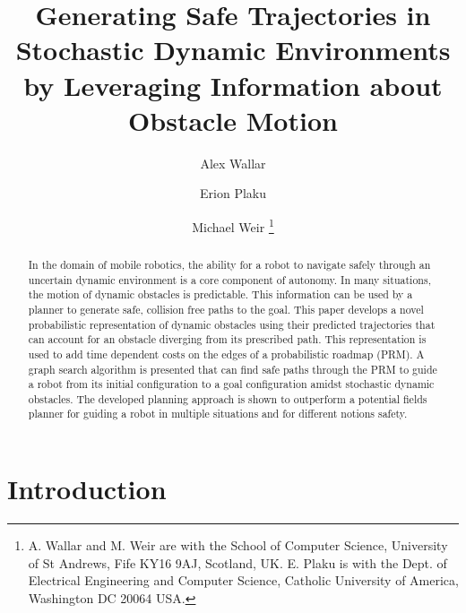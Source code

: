\documentclass[letterpaper, 10pt, conference]{ieeeconf}
\begin{document}
\title{Generating Safe Trajectories in Stochastic Dynamic Environments by
Leveraging Information about Obstacle Motion}


\author{Alex Wallar \and Erion Plaku \and Michael Weir
\thanks{A. Wallar and M. Weir are with the School of Computer Science,
  University of St Andrews, Fife KY16 9AJ, Scotland, UK. E. Plaku is with the
  Dept. of Electrical Engineering and Computer Science, Catholic
  University of America, Washington DC 20064 USA.
}}

\maketitle

\begin{abstract}

    In the domain of mobile robotics, the ability for a robot to navigate
    safely through an uncertain dynamic environment is a core component of
    autonomy.  In many situations, the motion of dynamic obstacles is
    predictable. This information can be used by a planner to generate safe,
    collision free paths to the goal. This paper develops a novel probabilistic
    representation of dynamic obstacles using their predicted trajectories that
    can account for an obstacle diverging from its prescribed path. This
    representation is used to add time dependent costs on the edges of a
    probabilistic roadmap (PRM). A graph search algorithm is presented that can
    find safe paths through the PRM to guide a robot from its initial
    configuration to a goal configuration amidst stochastic dynamic obstacles.
    The developed planning approach is shown to outperform a potential fields
    planner for guiding a robot in multiple situations and for different
    notions safety.

\end{abstract}


\section{Introduction}

\label{chapter:introduction}
\end{document}
